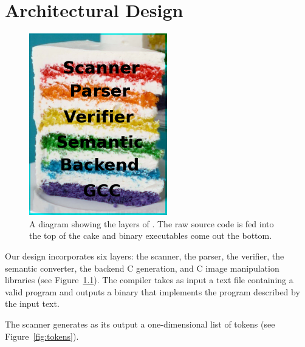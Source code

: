 \chapter{Architectural Design}
\label{chap:archdesign}




\begin{figure}
\begin{center}
\includegraphics[width=60mm]{figures/layers.png}
\caption{A diagram showing the layers of \sys{}. The raw source code is
fed into the top of the cake and binary executables come out the bottom.}
\label{fig:layers}
\end{center}
\end{figure}

Our design incorporates six layers: the scanner, the parser, the verifier,
the semantic converter, the backend C generation, and C image manipulation
libraries (see Figure~\ref{fig:layers}). The compiler takes as input
a text file containing a valid \sys{} program and outputs a binary that
implements the program described by the input text.

The scanner generates as its output a one-dimensional list of
tokens (see Figure~\ref{fig:tokens}).

